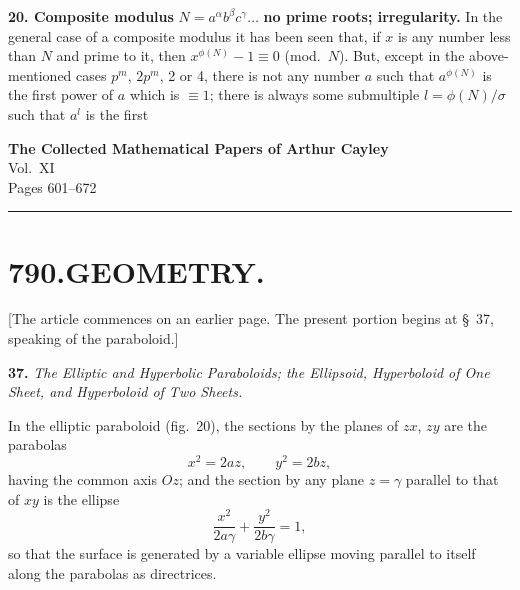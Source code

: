 \documentclass[11pt,a4paper]{book}
\begin{document}
\textbf{20. Composite modulus} $N=a^\alpha b^\beta c^\gamma\ldots$ \textbf{no prime roots; irregularity.} In the general case of a composite modulus it has been seen that, if $x$ is any number less than $N$ and prime to it, then $x^{\phi(N)}-1\equiv0$ (mod.\ $N$). But, except in the above-mentioned cases $p^m$, $2p^m$, 2 or 4, there is not any number $a$ such that $a^{\phi(N)}$ is the first power of $a$ which is $\equiv1$; there is always some submultiple $l=\phi(N)/\sigma$ such that $a^l$ is the first
\clearpage


\begin{center}
{\LARGE\bfseries The Collected Mathematical Papers of Arthur Cayley}\\[6pt]
{\Large Vol.~XI}\\[12pt]
{\large Pages 601--672}
\end{center}

\vspace{1em}
\hrule
\vspace{2em}



\section*{790.\quad GEOMETRY.}


\smallskip

[The article commences on an earlier page. The present portion begins at \S~37, 
speaking of the paraboloid.]

\smallskip

\textbf{37.}\quad
\textit{The Elliptic and Hyperbolic Paraboloids; the Ellipsoid, Hyperboloid of One Sheet, and Hyperboloid of Two Sheets.}

In the elliptic paraboloid (fig.~20), the sections by the planes of $zx$, $zy$ are the parabolas
\[
x^{2} = 2az, \qquad y^{2} = 2bz,
\]
having the common axis $Oz$; and the section by any plane $z = \gamma$ parallel to that of $xy$ is the ellipse
\[
\frac{x^{2}}{2a\gamma} + \frac{y^{2}}{2b\gamma} = 1,
\]
so that the surface is generated by a variable ellipse moving parallel to itself along the parabolas as directrices.
\end{document}
